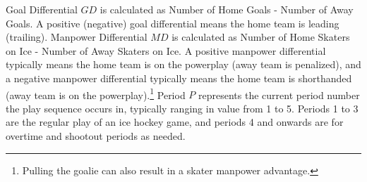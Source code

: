 \documentclass[]{article}
\begin{document}
\begin{table}[htdp]
\caption{Context Features}
\label{table:context-features}
\begin{center}
\end{center}
\label{default}
\end{table}%

Goal Differential $GD$ is calculated as Number of Home Goals - Number of Away Goals. A positive (negative) goal differential means the home team is leading (trailing).  Manpower Differential $MD$ is calculated as Number of Home Skaters on Ice - Number of Away Skaters on Ice. A positive manpower differential typically means the home team is on the powerplay (away team is penalized), and a negative manpower differential typically means the home team is shorthanded (away team is on the powerplay).\footnote{Pulling the goalie can also result in a skater manpower advantage.} Period $P$ represents the current period number the play sequence occurs in, typically ranging in value from 1 to 5. Periods 1 to 3 are the regular play of an ice hockey game, and periods 4 and onwards are for overtime and shootout periods as needed.


\end{document}
